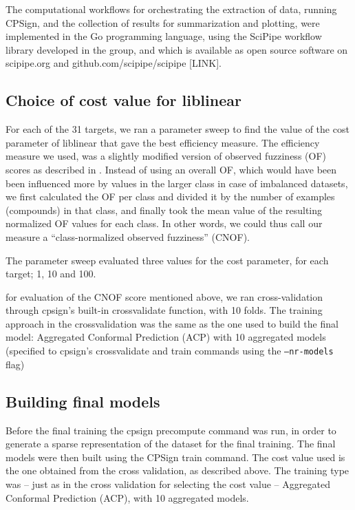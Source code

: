 \documentclass[utf8]{frontiersSCNS} %
\begin{document}
The computational workflows for orchestrating the extraction of data, running
CPSign, and the collection of results for summarization and plotting, were
implemented in the Go programming language, using the SciPipe workflow library
developed in the group, and which is available as open source software on
scipipe.org and github.com/scipipe/scipipe [LINK].

\subsection{Choice of cost value for liblinear}

For each of the 31 targets, we ran a parameter sweep to find the value of the cost
parameter of liblinear that gave the best efficiency measure. The efficiency
measure we used, was a slightly modified version of observed fuzziness (OF)
scores as described in \cite{Vovk2016}. Instead of using an overall OF, which
would have been been influenced more by values in the larger class in case of
imbalanced datasets, we first calculated the OF per class and divided it by
the number of examples (compounds) in that class, and finally took the mean
value of the resulting normalized OF values for each class. In other words,
we could thus call our measure a ``class-normalized observed fuzziness''
(CNOF).

The parameter sweep evaluated three values for the cost parameter, for each
target; 1, 10 and 100.

for evaluation of the CNOF score mentioned above, we ran cross-validation
through cpsign's built-in crossvalidate function, with 10 folds.  The training
approach in the crossvalidation was the same as the one used to build the final
model: Aggregated Conformal Prediction (ACP) with 10 aggregated models
(specified to cpsign's crossvalidate and train commands using the
\texttt{--nr-models} flag)

\subsection{Building final models}

Before the final training the cpsign precompute command was run, in order to
generate a sparse representation of the dataset for the final training.
The final models were then built using the CPSign train command. The cost value
used is the one obtained from the cross validation, as described above.
The training type was -- just as in the cross validation for selecting the cost
value -- Aggregated Conformal Prediction (ACP), with 10 aggregated models.
\end{document}
